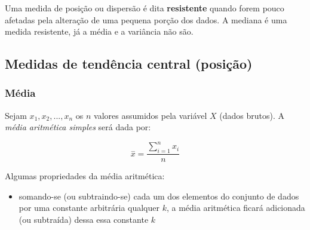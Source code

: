 \documentclass[
]{book}
\providecommand{\tightlist}{%
  \setlength{\itemsep}{0pt}\setlength{\parskip}{0pt}}
\begin{document}
\hfill\break

Uma medida de posição ou dispersão é dita \textbf{resistente} quando forem pouco afetadas pela alteração de uma pequena porção dos dados. A mediana é uma medida resistente, já a média e a variância não são.

\hypertarget{medidas-de-tenduxeancia-central-posiuxe7uxe3o}{%
\subsection{Medidas de tendência central (posição)}\label{medidas-de-tenduxeancia-central-posiuxe7uxe3o}}

\hypertarget{muxe9dia}{%
\subsubsection{Média}\label{muxe9dia}}

\hfill\break

Sejam \(x_{1}, x_{2}, ..., x_{n}\) os \(n\) valores assumidos pela variável \(X\) (dados brutos). A \emph{média aritmética simples} será dada por:

\hfill\break

\[
\stackrel{-}{x}=\frac{\sum _{i=1}^{n}{x}_{i}}{n}
\]

\hfill\break

Algumas propriedades da média aritmética:

\hfill\break

\begin{itemize}
\tightlist
\item
  somando-se (ou subtraindo-se) cada um dos elementos do conjunto de dados por uma constante arbitrária qualquer \(k\), a média aritmética ficará adicionada (ou subtraída) dessa essa constante \(k\)
\end{itemize}

\hfill\break
\end{document}
